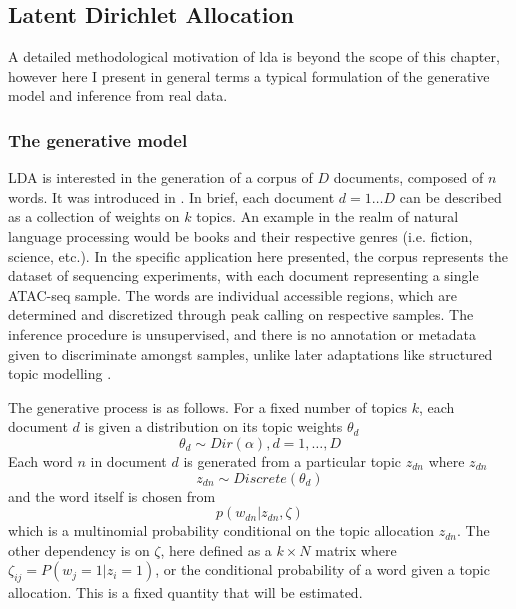 \subsection{Latent Dirichlet Allocation}

A detailed methodological motivation of \gls{lda} is beyond the scope of this chapter, however here I present in general terms a typical formulation of the generative model and inference from real data.  

\subsubsection{The generative model}

LDA is interested in the generation of a corpus of $D$ documents, composed of $n$ words. It was introduced in \textcite{Blei2003}. In brief, each document $d = 1 \ldots D$ can be described as a collection of weights on $k$ topics. An example in the realm of natural language processing would be books and their respective genres (i.e. fiction, science, etc.). In the specific application here presented, the corpus represents the dataset of sequencing experiments, with each document representing a single ATAC-seq sample. The words are individual accessible regions, which are determined and discretized through peak calling on respective samples. The inference procedure is unsupervised, and there is no annotation or metadata given to discriminate amongst samples, unlike later adaptations like structured topic modelling \cite{Roberts2019}.

The generative process is as follows. For a fixed number of topics $k$, each document $d$ is given a distribution on its topic weights $\theta_d$ $$ \theta_d \sim Dir(\alpha), d = 1, \ldots, D $$ Each word $n$ in document $d$ is generated from a particular topic $z_{dn}$ where  $z_{dn}$ $$ z_{dn} \sim Discrete(\theta_d) $$ and the word itself is chosen from $$ p(w_{dn} | z_{dn}, \zeta) $$ which is a multinomial probability conditional on the topic allocation $z_{dn}$. The other dependency is on $\zeta$, here defined as a $k \times N$ matrix where $\zeta_{ij} = P(w_j =1 | z_i = 1)$, or the conditional probability of a word given a topic allocation. This is a fixed quantity that will be estimated. 

